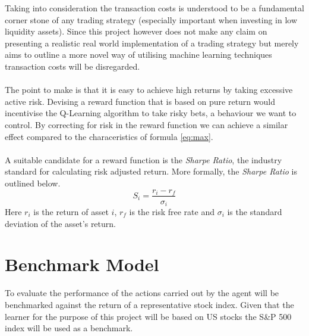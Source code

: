 \documentclass[dvips,12pt]{article}
\begin{document}
Taking into consideration the transaction costs is understood to be a fundamental corner stone of any trading strategy (especially important when investing in low liquidity assets). Since this project however does not make any claim on presenting a realistic real world implementation of a trading strategy but merely aims to outline a more novel way of utilising machine learning techniques transaction costs will be disregarded.
\\\\
The point to make is that it is easy to achieve high returns by taking excessive active risk. Devising a reward function that is based on pure return would incentivise the Q-Learning algorithm to take risky bets, a behaviour we want to control. 
By correcting for risk in the reward function we can achieve a similar effect compared to the characeristics of formula \ref{eq:max}.
\\\\
A suitable candidate for a reward function is the \emph{Sharpe Ratio}, the industry standard for calculating risk adjusted return. More formally, the \emph{Sharpe Ratio} is outlined below.
\begin{equation}
	S_i = \frac{r_i - r_f}{\sigma_i}
\end{equation}
Here $r_i$ is the return of asset $i$, $r_f$ is the risk free rate and $\sigma_i$ is the standard deviation of the asset's return.

\section{Benchmark Model}
To evaluate the performance of the actions carried out by the agent will be benchmarked against the return of a representative stock index. Given that the learner for the purpose of this project will be based on US stocks the S\&P 500 index will be used as a benchmark.
\end{document}
